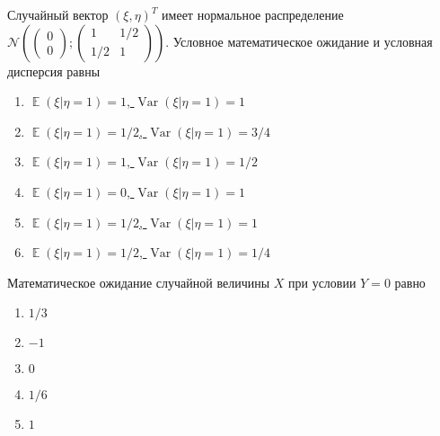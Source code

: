 \documentclass[t]{beamer}
\DeclareMathOperator{\Var}{Var}
\DeclareMathOperator{\E}{\mathbb{E}}
\newcommand{\cN}{\mathcal{N}}
\begin{document}
 \begin{frame} \label{28} 
\begin{block}{28} 

    Случайный вектор $(\xi, \eta)^T$ имеет нормальное распределение
    $\cN \left(
    \begin{pmatrix}
      0 \\
      0
    \end{pmatrix};
    \begin{pmatrix}
      1 & 1/2 \\
      1/2 & 1
    \end{pmatrix}
  \right)$. Условное математическое ожидание и условная дисперсия равны
  


 \end{block} 
\begin{enumerate} 
\item[] \hyperlink{28-No}{\beamergotobutton{} $\E(\xi | \eta=1)=1$, $\Var(\xi | \eta=1)=1$}
\item[] \hyperlink{28-Yes}{\beamergotobutton{} $\E(\xi | \eta=1)=1/2$, $\Var(\xi | \eta=1)=3/4$}
\item[] \hyperlink{28-No}{\beamergotobutton{} $\E(\xi | \eta=1)=1$, $\Var(\xi | \eta=1)=1/2$}
\item[] \hyperlink{28-No}{\beamergotobutton{} $\E(\xi | \eta=1)=0$, $\Var(\xi | \eta=1)=1$}
\item[] \hyperlink{28-No}{\beamergotobutton{} $\E(\xi | \eta=1)=1/2$, $\Var(\xi | \eta=1)=1$}
\item[] \hyperlink{28-No}{\beamergotobutton{} $\E(\xi | \eta=1)=1/2$, $\Var(\xi | \eta=1)=1/4$}
\end{enumerate} 
\end{frame} 


 \begin{frame} \label{29} 
\begin{block}{29} 

  Математическое ожидание случайной величины $X$ при условии $Y=0$ равно
  


 \end{block} 
\begin{enumerate} 
\item[] \hyperlink{29-No}{\beamergotobutton{} $1/3$}
\item[] \hyperlink{29-No}{\beamergotobutton{} $-1$}
\item[] \hyperlink{29-No}{\beamergotobutton{} $0$}
\item[] \hyperlink{29-No}{\beamergotobutton{} $1/6$}
\item[] \hyperlink{29-Yes}{\beamergotobutton{} $1$}
\end{enumerate} 
\end{frame} 
\end{document}
